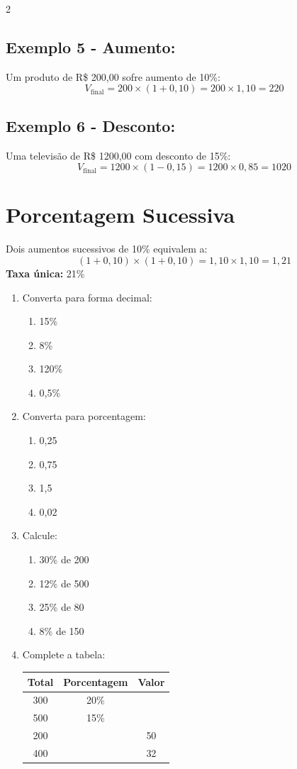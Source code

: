 \documentclass[11pt]{article}
\begin{document}
\begin{multicols}{2}
\subsection*{Exemplo 5 - Aumento:}
Um produto de R\$ 200,00 sofre aumento de 10\%:
\[
V_{\text{final}} = 200 \times (1 + 0,10) = 200 \times 1,10 = 220
\]

\subsection*{Exemplo 6 - Desconto:}
Uma televisão de R\$ 1200,00 com desconto de 15\%:
\[
V_{\text{final}} = 1200 \times (1 - 0,15) = 1200 \times 0,85 = 1020
\]

\section*{Porcentagem Sucessiva}

Dois aumentos sucessivos de 10\% equivalem a:
\[
(1 + 0,10) \times (1 + 0,10) = 1,10 \times 1,10 = 1,21
\]
\textbf{Taxa única:} 21\%

\begin{enumerate}[leftmargin=*]

\item Converta para forma decimal:
\begin{enumerate}[label=\alph*)]
\item 15\%
\item 8\%
\item 120\%
\item 0,5\%
\end{enumerate}

\item Converta para porcentagem:
\begin{enumerate}[label=\alph*)]
\item 0,25
\item 0,75
\item 1,5
\item 0,02
\end{enumerate}

\item Calcule:
\begin{enumerate}[label=\alph*)]
\item 30\% de 200
\item 12\% de 500
\item 25\% de 80
\item 8\% de 150
\end{enumerate}

\item Complete a tabela:
\begin{center}
\begin{tabular}{|c|c|c|}
\hline
\textbf{Total} & \textbf{Porcentagem} & \textbf{Valor} \\
\hline
300 & 20\% & \\
500 & 15\% & \\
200 & & 50 \\
400 & & 32 \\
\hline
\end{tabular}
\end{center}


\end{enumerate}
\end{multicols}
\end{document}
